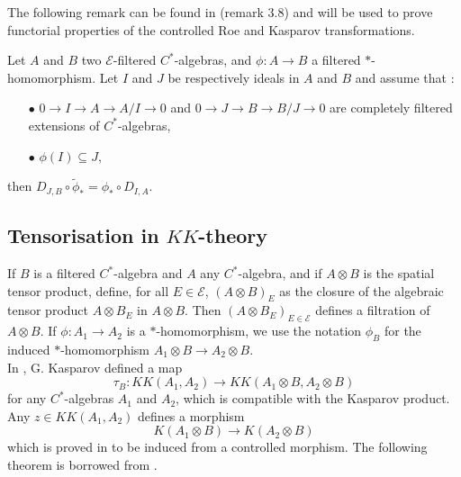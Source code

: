 The following remark can be found in \cite{OY2} (remark $3.8$) and will be used to prove functorial properties of the controlled Roe and Kasparov transformations.

\begin{rk}\label{rk3.8}
Let $A$ and $B$ two $\mathcal E$-filtered $C^*$-algebras, and $\phi : A\rightarrow B$ a filtered $*$-homomorphism. Let $I$ and $J$ be respectively ideals in $A$ and $B$ and assume that :
\begin{itemize}
\item[$\bullet$] $0 \rightarrow I \rightarrow A \rightarrow A/ I \rightarrow 0$ and $0 \rightarrow J \rightarrow B \rightarrow B/J \rightarrow 0$ are completely filtered extensions of $C^*$-algebras,
\item[$\bullet$] $\phi(I)\subseteq J$,
\end{itemize}
then $D_{J,B}\circ \tilde\phi_* = \phi_* \circ D_{I,A}$.
\end{rk}

\subsection{Tensorisation in $KK$-theory}

If $B$ is a filtered $C^*$-algebra and $A$ any $C^*$-algebra, and if $A\otimes B$ is the spatial tensor product, define, for all $E\in \mathcal E$, $(A\otimes B)_E$ as the closure of the algebraic tensor product $A\otimes B_E$ in $A\otimes B$. Then $(A\otimes B_E)_{E\in\mathcal E}$ defines a filtration of $A\otimes B$. If $\phi : A_1 \rightarrow A_2$ is a $*$-homomorphism, we use the notation $\phi_B$ for the induced $*$-homomorphism $A_1\otimes B\rightarrow A_2\otimes B$. \\

In \cite{kasparovKKNovikov}, G. Kasparov defined a map
\[\tau_B : KK(A_1,A_2)\rightarrow KK(A_1\otimes B, A_2\otimes B)\]
for any $C^*$-algebras $A_1$ and $A_2$, which is compatible with the Kasparov product. Any $z\in KK(A_1,A_2)$ defines a morphism
\[K(A_1\otimes B)\rightarrow K(A_2\otimes B)\]
which is proved in \cite{OY2} to be induced from a controlled morphism. The following theorem is borrowed from \cite{OY2}.\\

